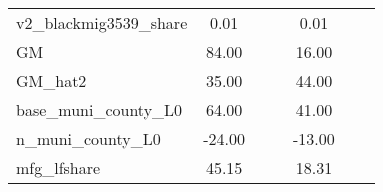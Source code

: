 \begin{table}[htbp]
\begin{tabular}{l*{2}{ccc}}
v2\_blackmig3539\_share&        0.01&            &            &        0.01&            &            \\
GM                  &       84.00&            &            &       16.00&            &            \\
GM\_hat2             &       35.00&            &            &       44.00&            &            \\
base\_muni\_county\_L0 &       64.00&            &            &       41.00&            &            \\
n\_muni\_county\_L0    &      -24.00&            &            &      -13.00&            &            \\
mfg\_lfshare         &       45.15&            &            &       18.31&            &            \\
\bottomrule
\end{tabular}
\end{table}
